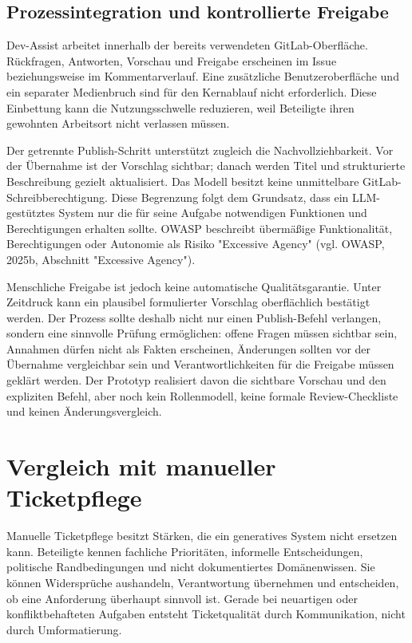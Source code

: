 \subsection{Prozessintegration und kontrollierte Freigabe}

Dev-Assist arbeitet innerhalb der bereits verwendeten GitLab-Oberfläche. Rückfragen, Antworten, Vorschau und Freigabe erscheinen im Issue beziehungsweise im Kommentarverlauf. Eine zusätzliche Benutzeroberfläche und ein separater Medienbruch sind für den Kernablauf nicht erforderlich. Diese Einbettung kann die Nutzungsschwelle reduzieren, weil Beteiligte ihren gewohnten Arbeitsort nicht verlassen müssen.

Der getrennte Publish-Schritt unterstützt zugleich die Nachvollziehbarkeit. Vor der Übernahme ist der Vorschlag sichtbar; danach werden Titel und strukturierte Beschreibung gezielt aktualisiert. Das Modell besitzt keine unmittelbare GitLab-Schreib\-berechtigung. Diese Begrenzung folgt dem Grundsatz, dass ein LLM-gestütztes System nur die für seine Aufgabe notwendigen Funktionen und Berechtigungen erhalten sollte. OWASP beschreibt übermäßige Funktionalität, Berechtigungen oder Autonomie als Risiko "Excessive Agency" (vgl. OWASP, 2025b, Abschnitt "Excessive Agency").

Menschliche Freigabe ist jedoch keine automatische Qualitätsgarantie. Unter Zeitdruck kann ein plausibel formulierter Vorschlag oberflächlich bestätigt werden. Der Prozess sollte deshalb nicht nur einen Publish-Befehl verlangen, sondern eine sinnvolle Prüfung ermöglichen: offene Fragen müssen sichtbar sein, Annahmen dürfen nicht als Fakten erscheinen, Änderungen sollten vor der Übernahme vergleichbar sein und Verantwortlichkeiten für die Freigabe müssen geklärt werden. Der Prototyp realisiert davon die sichtbare Vorschau und den expliziten Befehl, aber noch kein Rollenmodell, keine formale Review-Checkliste und keinen Änderungsvergleich.

\section{Vergleich mit manueller Ticketpflege}

Manuelle Ticketpflege besitzt Stärken, die ein generatives System nicht ersetzen kann. Beteiligte kennen fachliche Prioritäten, informelle Entscheidungen, politische Randbedingungen und nicht dokumentiertes Domänenwissen. Sie können Widersprüche aushandeln, Verantwortung übernehmen und entscheiden, ob eine Anforderung überhaupt sinnvoll ist. Gerade bei neuartigen oder konfliktbehafteten Aufgaben entsteht Ticketqualität durch Kommunikation, nicht durch Umformatierung.


